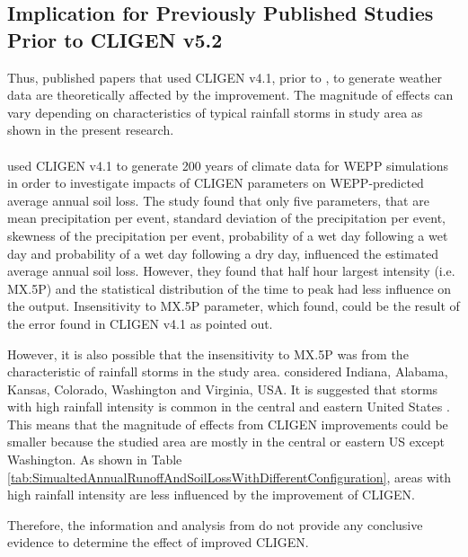 \subsection{Implication for Previously Published Studies Prior to CLIGEN v5.2}

Thus, published papers that used CLIGEN v4.1, prior to \citet{yu2000-301}, to
generate weather data are theoretically affected by the improvement. The
magnitude of effects can vary depending on characteristics of typical rainfall
storms in study area as shown in the present research.

\paragraph{\citet{baffaut1996-447}} used CLIGEN v4.1 to generate 200 years of
climate data for WEPP simulations in order to investigate impacts of CLIGEN
parameters on WEPP-predicted average annual soil loss. The study found that only
five parameters, that are mean precipitation per event, standard deviation of
the precipitation per event, skewness of the precipitation per event,
probability of a wet day following a wet day and probability of a wet day
following a dry day, influenced the estimated average annual soil loss. However,
they found that half hour largest intensity (i.e. {MX.5P}) and the statistical
distribution of the time to peak had less influence on the output. Insensitivity
to {MX.5P} parameter, which \citet{baffaut1996-447} found, could be the result
of the error found in CLIGEN v4.1 as \citet{yu2000-301} pointed out.

However, it is also possible that the insensitivity to {MX.5P} was from
the characteristic of rainfall storms in the study area. \citet{baffaut1996-447}
considered Indiana, Alabama, Kansas, Colorado, Washington and Virginia, USA. It
is suggested that storms with high rainfall intensity is common in the central
and eastern United States \citep{ashley2003-3003}. This means that the magnitude
of effects from CLIGEN improvements could be smaller because the studied
area are mostly in the central or eastern US except Washington. As shown in
Table \ref{tab:SimualtedAnnualRunoffAndSoilLossWithDifferentConfiguration},
areas with high rainfall intensity are less influenced by the improvement of
CLIGEN.

Therefore, the information and analysis from \citet{baffaut1996-447} do not
provide any conclusive evidence to determine the effect of improved CLIGEN.


